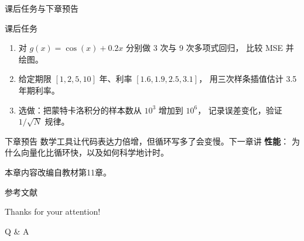 \documentclass[9pt]{ctexbeamer}
\begin{document}
\begin{frame}{课后任务与下章预告}
	\begin{block}{课后任务}
		\begin{enumerate}
			\item 对 $g(x)=\cos(x)+0.2x$ 分别做 3 次与 9 次多项式回归，
				比较 MSE 并绘图。
			\item 给定期限 $[1,2,5,10]$ 年、利率 $[1.6, 1.9, 2.5, 3.1]$，
				用三次样条插值估计 3.5 年期利率。
			\item 选做：把蒙特卡洛积分的样本数从 $10^3$ 增加到 $10^6$，
				记录误差变化，验证 $1/\sqrt{N}$ 规律。
		\end{enumerate}
	\end{block}
	\begin{exampleblock}{下章预告}
		数学工具让代码表达力倍增，但循环写多了会变慢。下一章讲 \textbf{性能}：
		为什么向量化比循环快，以及如何科学地计时。
	\end{exampleblock}
	\begin{center}
		\vspace{0.5em}
		本章内容改编自教材第11章\citep{hilpisch2018python}。
	\end{center}
\end{frame}


\appendix

\begin{frame}[allowframebreaks]{参考文献}
	
	
\end{frame}

\begin{frame}
	\begin{center}
		{\Huge\calligra Thanks for your attention!}
		\vspace{1cm}

		{\Huge Q \& A}
	\end{center}
\end{frame}
\end{document}
